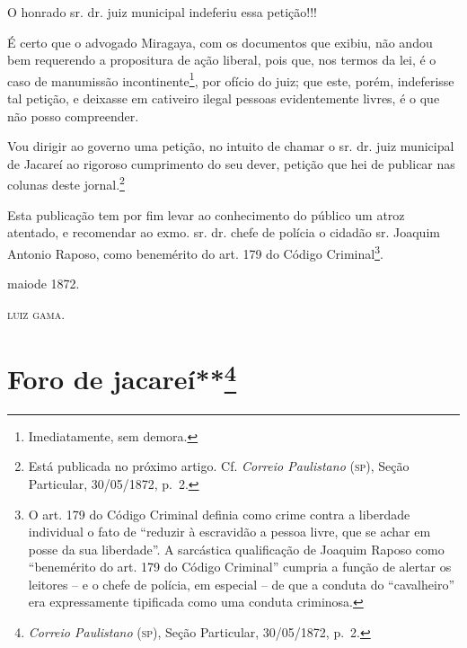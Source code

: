 O honrado sr. dr. juiz municipal indeferiu essa petição!!!

É certo que o advogado Miragaya, com os documentos que exibiu, não andou
bem requerendo a propositura de ação liberal, pois que, nos termos da
lei, é o caso de manumissão incontinente\footnote{ Imediatamente, sem
  demora.}, por ofício do juiz; que este, porém, indeferisse tal
petição, e deixasse em cativeiro ilegal pessoas evidentemente livres, é
o que não posso compreender.

Vou dirigir ao governo uma petição, no intuito de chamar o sr. dr. juiz
municipal de Jacareí ao rigoroso cumprimento do seu dever, petição que
hei de publicar nas colunas deste jornal.\footnote{ Está publicada no
  próximo artigo. Cf. \emph{Correio Paulistano} (\textsc{sp}), Seção Particular,
  30/05/1872, p.~2.}

Esta publicação tem por fim levar ao conhecimento do público um atroz
atentado, e recomendar ao exmo. sr. dr. chefe de polícia o cidadão sr.
Joaquim Antonio Raposo, como benemérito do art. 179 do Código
Criminal\footnote{ O art. 179 do Código Criminal definia como crime
  contra a liberdade individual o fato de ``reduzir à escravidão a pessoa
  livre, que se achar em posse da sua liberdade''. A sarcástica
  qualificação de Joaquim Raposo como ``benemérito do art. 179 do Código
  Criminal'' cumpria a função de alertar os leitores -- e o chefe de
  polícia, em especial -- de que a conduta do ``cavalheiro'' era
  expressamente tipificada como uma conduta criminosa.}.

maiode 1872.

\textsc{luiz gama}.

\chapter{Foro de jacareí**\footnote{\emph{Correio Paulistano} (\textsc{sp}), Seção Particular,
  30/05/1872, p.~2.} } %

